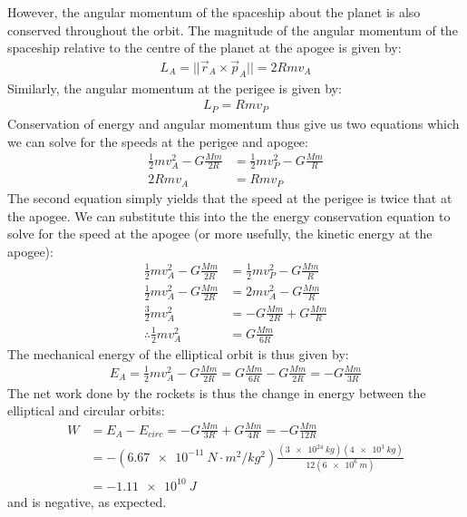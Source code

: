 \begin{solution}
However, the angular momentum of the spaceship about the planet is also conserved throughout the orbit. The magnitude of the angular momentum of the spaceship relative to the centre of the planet at the apogee is given by:
\begin{align*}
L_A=||\vec r_A \times \vec p_A||=2Rmv_A
\end{align*}
Similarly, the angular momentum at the perigee is given by:
\begin{align*}
L_P=Rmv_P
\end{align*}
Conservation of energy and angular momentum thus give us two equations which we can solve for the speeds at the perigee and apogee:
\begin{align*}
\frac{1}{2}mv_A^2-G\frac{Mm}{2R} &= \frac{1}{2}mv_P^2-G\frac{Mm}{R} \\
2Rmv_A &= Rmv_P
\end{align*}
The second equation simply yields that the speed at the perigee is twice that at the apogee. We can substitute this into the the energy conservation equation to solve for the speed at the apogee (or more usefully, the kinetic energy at the apogee):
\begin{align*}
\frac{1}{2}mv_A^2-G\frac{Mm}{2R} &= \frac{1}{2}mv_P^2-G\frac{Mm}{R}\\
\frac{1}{2}mv_A^2-G\frac{Mm}{2R} &= 2mv_A^2-G\frac{Mm}{R}\\
\frac{3}{2}mv_A^2 &= -G\frac{Mm}{2R}+G\frac{Mm}{R}\\
\therefore \frac{1}{2}mv_A^2&=G\frac{Mm}{6R}
\end{align*}
The mechanical energy of the elliptical orbit is thus given by:
\begin{align*}
E_A=\frac{1}{2}mv_A^2-G\frac{Mm}{2R}=G\frac{Mm}{6R}-G\frac{Mm}{2R}=-G\frac{Mm}{3R}
\end{align*}
The net work done by the rockets is thus the change in energy between the elliptical and circular orbits:
\begin{align*}
W &= E_A-E_{circ}=-G\frac{Mm}{3R}+G\frac{Mm}{4R}=-G\frac{Mm}{12R}\\
&=-(\SI{6.67e-11}{N\cdot m^2/kg^2})\frac{(\SI{3e24}{kg})(\SI{4e3}{kg})}{12(\SI{6e6}{m})}\\
&=\SI{-1.11e10}{J}
\end{align*}
and is negative, as expected.

\end{solution}


